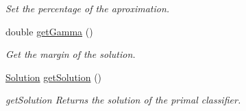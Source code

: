 \begin{DoxyCompactItemize}
\begin{DoxyCompactList}\small\item\em Set the percentage of the aproximation. \end{DoxyCompactList}\item 
double \hyperlink{class_primal_classifier_a320c67c29eeb85d5d05f7db1de7fde41}{get\+Gamma} ()
\begin{DoxyCompactList}\small\item\em Get the margin of the solution. \end{DoxyCompactList}\item 
\hyperlink{class_solution}{Solution} \hyperlink{class_primal_classifier_a1a3d9ba4e80c58418db0d8454168b910}{get\+Solution} ()
\begin{DoxyCompactList}\small\item\em get\+Solution Returns the solution of the primal classifier. \end{DoxyCompactList}\end{DoxyCompactItemize}
